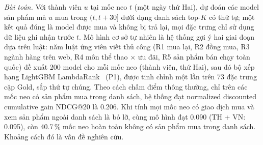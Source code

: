 \documentclass[jtehm]{ieeeaccess}
\makeatletter
\newcommand{\nRefCond}{0.206}        %
\newcommand{\nRefUncond}{0.095}      %
\newcommand{\nNoPosShare}{40.7}      %
\makeatother
\begin{document}
\textit{Bài toán.} Với thành viên $u$ tại mốc neo $t$ (một ngày thứ Hai), dự đoán các model sản phẩm mà $u$ mua trong $(t, t+30]$ dưới dạng danh sách top-$K$ có thứ tự; một kết quả đúng là model được mua và không bị trả lại, mọi đặc trưng chỉ sử dụng dữ liệu ghi nhận trước $t$. Mô hình cơ sở tự nhiên là hệ thống gợi ý hai giai đoạn dựa trên luật: năm luật ứng viên viết thủ công (R1 mua lại, R2 đồng mua, R3 ngành hàng trên web, R4 môn thể thao $\times$ ưu đãi, R5 sản phẩm bán chạy toàn quốc) đề xuất 200 model cho mỗi mốc neo (thành viên, thứ Hai), sau đó bộ xếp hạng LightGBM LambdaRank~\cite{ke2017lightgbm,burges2010lambdamart} (P1), được tinh chỉnh một lần trên 73 đặc trưng cặp Gold, sắp thứ tự chúng. Theo cách chấm điểm thông thường, chỉ trên các mốc neo có sản phẩm mua trong danh sách, hệ thống đạt normalized discounted cumulative gain NDCG@20 là \nRefCond{}. Khi tính mọi mốc neo có giao dịch mua và xem sản phẩm ngoài danh sách là bỏ lỡ, cùng mô hình đạt 0.090 (TH + VN: \nRefUncond{}), còn \nNoPosShare{}\,\% mốc neo hoàn toàn không có sản phẩm mua trong danh sách. Khoảng cách đó là vấn đề nghiên cứu.
\end{document}

